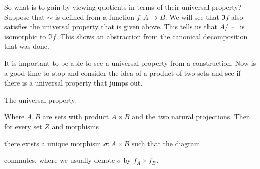 \documentclass{report}
\begin{document}
So what is to gain by viewing quotients in terms of their universal property? Suppose that $\sim $ is defined from a function $f : A \rightarrow B$. We will see that $\Im{f}$ also satisfies the universal property that is given above. This tells us that $A/\sim $ is isomorphic to $\Im{f}$. This shows an abstraction from the canonical decomposition that was done.

It is important to be able to see a universal property from a construction. Now is a good time to stop and consider the idea of a product of two sets and see if there is a universal property that jumps out.

The universal property:
    \begin{center}
    \end{center}
Where $A, B$ are sets with product $A \times B$ and the two natural projections. Then for every set $Z$ and morphisms
    \begin{center}
    \end{center}
there exists a unique morphism $\sigma : A \times B$ such that the diagram
    \begin{center}
    \end{center}
commutes, where we usually denote $\sigma$ by $f_{A} \times f_{B}$.
\end{document}
